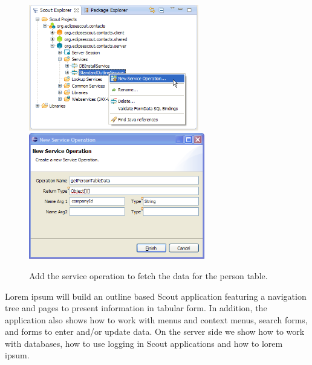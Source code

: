 \documentclass[a4paper,10pt,twoside]{book}
\begin{document}
\begin{figure}
\includegraphics[height=5.5cm]{new_service_persontabledata_contextmenu.png} \hspace{5mm}
\includegraphics[height=5.5cm]{new_service_persontabledata.png}
\caption{Add the service operation to fetch the data for the person table. }
\end{figure}

Lorem ipsum will build an outline based Scout application featuring a navigation tree and pages to present information in tabular form. 
In addition, the application also shows how to work with menus and context menus, search forms, and forms to enter and/or update data. 
On the server side we show how to work with databases, how to use logging in Scout applications and how to lorem ipsum. 
\end{document}
